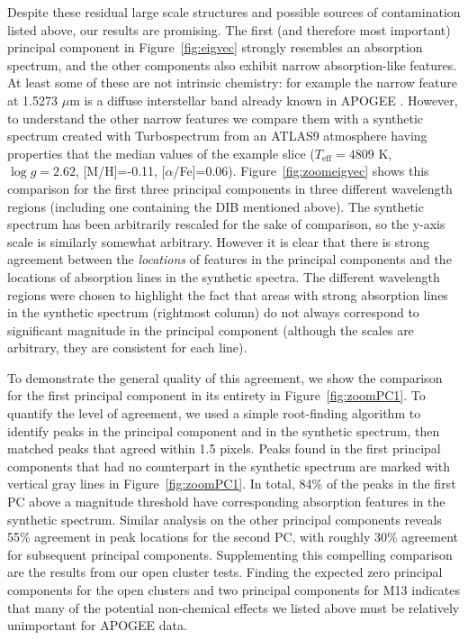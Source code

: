 \documentclass[a4paper,fleqn,usenatbib]{mnras}
\newcommand       \teff     {{T_{\mathrm{eff}}}}
\begin{document}
Despite these residual large scale structures and possible sources of contamination listed above, our results are promising. The first (and therefore most important) principal component in Figure~\ref{fig:eigvec} strongly resembles an absorption spectrum, and the other components also exhibit narrow absorption-like features. At least some of these are not intrinsic chemistry: for example the narrow feature at 1.5273 $\mu$m is a diffuse interstellar band already known in APOGEE \citep{Zasowski2014}. However, to understand the other narrow features we compare them with a synthetic spectrum created with Turbospectrum \citep{Turbospectrum} from an ATLAS9 atmosphere \citep{atlas9} having properties that the median values of the example slice ($\teff = 4809$ K, $\log g = 2.62$, [M/H]=-0.11, [$\alpha$/Fe]=0.06). Figure~\ref{fig:zoomeigvec} shows this comparison for the first three principal components in three different wavelength regions (including one containing the DIB mentioned above). The synthetic spectrum has been arbitrarily rescaled for the sake of comparison, so the y-axis scale is similarly somewhat arbitrary. However it is clear that there is strong agreement between the \textit{locations} of features in the principal components and the locations of absorption lines in the synthetic spectra. The different wavelength regions were chosen to highlight the fact that areas with strong absorption lines in the synthetic spectrum (rightmost column) do not always correspond to significant magnitude in the principal component (although the scales are arbitrary, they are consistent for each line).

To demonstrate the general quality of this agreement, we show the comparison for the first principal component in its entirety in Figure~\ref{fig:zoomPC1}. To quantify the level of agreement, we used a simple root-finding algorithm to identify peaks in the principal component and in the synthetic spectrum, then matched peaks that agreed within 1.5 pixels. Peaks found in the first principal components that had no counterpart in the synthetic spectrum are marked with vertical gray lines in Figure~\ref{fig:zoomPC1}. In total, 84\% of the peaks in the first PC above a magnitude threshold have corresponding absorption features in the synthetic spectrum. Similar analysis on the other principal components reveals 55\% agreement in peak locations for the second PC, with roughly 30\% agreement for subsequent principal components. Supplementing this compelling comparison are the results from our open cluster tests. Finding the expected zero principal components for the open clusters and two principal components for M13 indicates that many of the potential non-chemical effects we listed above must be relatively unimportant for APOGEE data.
\end{document}
